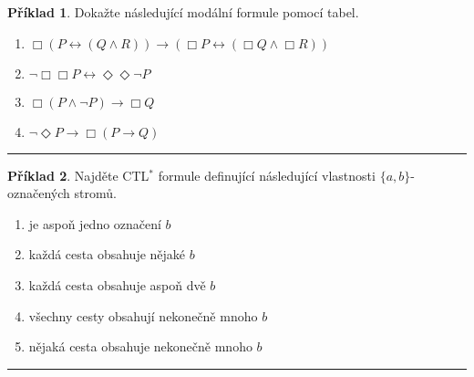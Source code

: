 \documentclass[a4paper]{article}
\theoremstyle{definition}
\newtheorem{priklad}{Příklad}
\begin{document}
\begin{priklad}
    Dokažte následující modální formule pomocí tabel.
    
    \begin{enumerate}
      \item $ \Box (P\leftrightarrow (Q\wedge R)) \rightarrow (\Box P\leftrightarrow (\Box Q\wedge \Box R)) $
      \item $ \neg\Box\Box P\leftrightarrow \Diamond\Diamond\neg P $
      \item $ \Box (P\wedge \neg P)\rightarrow \Box Q $
      \item $ \neg \Diamond P\rightarrow \Box(P\rightarrow Q) $
    \end{enumerate}
    
\noindent\rule{\linewidth}{.2pt}    
\end{priklad}

\begin{priklad}
    Najděte CTL$ ^* $ formule definující následující vlastnosti $ \{a,b\} $-označených stromů.
    
    \begin{enumerate}
      \item je aspoň jedno označení $ b $
      \item každá cesta obsahuje nějaké $ b $
      \item každá cesta obsahuje aspoň dvě $ b $
      \item všechny cesty obsahují nekonečně mnoho $ b $
      \item nějaká cesta obsahuje nekonečně mnoho $ b $
    \end{enumerate}
    
\noindent\rule{\linewidth}{.2pt}    
\end{priklad}

%     
%     
\end{document}
